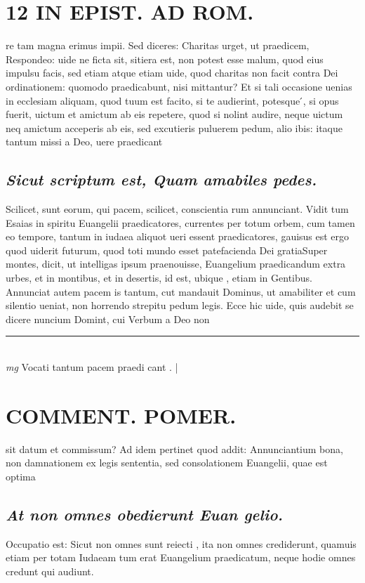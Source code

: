 \documentclass{article}
\begin{document}
\begin{pages}
\section*{12 IN EPIST. AD ROM.  }
\marginpar{[ p.]}\pstart re tam magna erimus impii. Sed diceres: Charitas urget, ut praedicem, Respondeo: uide ne ficta sit, sitiera est, non potest esse malum, quod eius impulsu facis, sed etiam atque etiam uide, quod charitas non facit contra Dei ordinationem: quomodo praedicabunt, nisi mittantur? Et si tali occasione uenias in ecclesiam aliquam, quod tuum est facito, si te audierint, potesque ́, si opus fuerit, uictum et amictum ab eis repetere, quod si nolint audire, neque uictum neq amictum acceperis ab eis, sed excutieris puluerem pedum, alio ibis: itaque tantum missi a Deo, uere praedicant\pend
{}
{}
\subsection*{\textit{Sicut scriptum est, Quam amabiles pedes. }}\pstart Scilicet, sunt eorum, qui pacem, scilicet, conscientia rum annunciant. Vidit tum Esaias in spiritu Euangelii praedicatores, currentes per totum orbem, cum tamen eo tempore, tantum in iudaea aliquot ueri essent praedicatores, gauisus est ergo quod uiderit futurum, quod toti mundo esset patefacienda Dei gratiaSuper montes, dicit, ut intelligas ipsum praenouisse, Euangelium praedicandum extra urbes, et in montibus, et in desertis, id est, ubique , etiam in Gentibus. Annunciat autem pacem is tantum, cut mandauit Dominus, ut amabiliter et cum silentio ueniat, non horrendo strepitu pedum legis. Ecce hic uide, quis audebit se dicere nuncium Domint, cui Verbum a Deo non  \pend
\vspace{0.5cm}\noindent
\vspace{0.2cm}\rule{1cm}{0.2pt}\\ 
\hspace{0.2cm}\textit{mg}
\footnotesize Vocati tantum pacem praedi cant .  
\normalsize| 
\section*{COMMENT. POMER.  }\pstart sit datum et commissum? Ad idem pertinet quod addit: Annunciantium bona, non damnationem ex legis sententia, sed consolationem Euangelii, quae est optima\pend
{}
{}
\subsection*{\textit{At non omnes obedierunt Euan gelio. }}\pstart Occupatio est: Sicut non omnes sunt reiecti , ita non omnes crediderunt, quamuis etiam per totam Iudaeam tum erat Euangelium praedicatum, neque hodie omnes credunt qui audiunt.  \pend
{}
{}

\end{pages}
\end{document}
